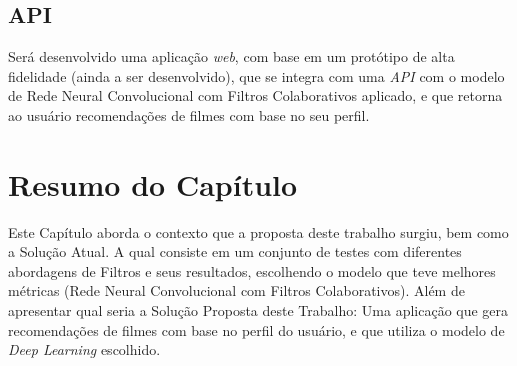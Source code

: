 \subsection{API}\label{subsec:api}
Será desenvolvido uma aplicação \textit{web}, com base em um protótipo de alta fidelidade (ainda a ser desenvolvido),
que se integra com uma \textit{API} com o modelo de Rede Neural Convolucional com Filtros Colaborativos aplicado, e que 
retorna ao usuário recomendações de filmes com base no seu perfil.

\section{Resumo do Capítulo}\label{sec:resprop}
Este Capítulo aborda o contexto que a proposta deste trabalho surgiu, bem como a Solução Atual. A qual consiste em um conjunto
de testes com diferentes abordagens de Filtros e seus resultados, escolhendo o modelo que teve melhores métricas 
(Rede Neural Convolucional com Filtros Colaborativos). Além de apresentar qual seria a Solução Proposta deste Trabalho:
Uma aplicação que gera recomendações de filmes com base no perfil do usuário, e que utiliza o modelo de \textit{Deep Learning}
escolhido.